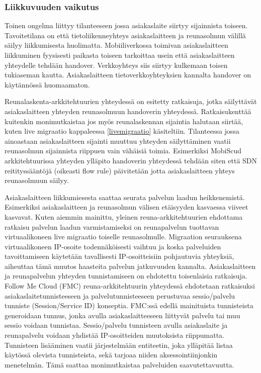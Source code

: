 \subsubsection*{Liikkuvuuden vaikutus}

Toinen ongelma liittyy tilanteeseen jossa asiakaslaite siirtyy sijainnista toiseen. Tavoitetilana on että tietoliikenneyhteys asiakaslaitteen ja reunasolmun välillä säilyy liikkumisesta huolimatta.  
Mobiiliverkossa toimivan asiakaslaitteen liikkuminen fyysisesti paikasta toiseen tarkoittaa usein että asiakaslaitteen yhteydelle tehdään handover.
Verkkoyhteys siis siirtyy kulkemaan toisen tukiaseman kautta. 
Asiakaslaitteen tietoverkkoyhteyksien kannalta handover on käytännössä huomaamaton.

Reunalaskenta-arkkitehtuurien yhteydessä on esitetty ratkaisuja, jotka säilyttävät asiakaslaitteen yhteyden reunasolmuun handoverin yhteydessä. Ratkaisukenttää kuitenkin monimutkaistaa jos myös reunalaskennan sijaintia halutaan siirtää, kuten live migraatio kappaleessa \ref{livemigraatio} käsiteltiin.
Tilanteessa jossa ainoastaan asiakaslaitteen sijainti muuttuu yhteyden säilyttäminen vaatii reunasolmun sijainnista riippuen vain vähäisiä toimia. Esimerkiksi MobiScud arkkitehtuurissa yhteyden ylläpito handoverin yhteydessä tehdään siten että SDN reitityssääntöjä (oikeasti flow rule) päivitetään jotta asiakaslaitteen yhteys reunasolmuun säilyy. 

Asiakaslaitteen liikkumiesesta saattaa seurata palvelun laadun heikkenemistä. Esimerkiksi asiakaslaitteen ja reunasolmun välisen etäisyyden kasvaessa viiveet kasvavat.
Kuten aiemmin mainittu, yleinen reuna-arkkitehtuurien ehdottama ratkaisu palvelun laadun varmistamiseksi on reunapalvelun tuottavan virtuaalikoneen live migraatio toiselle reunasolmulle.
Migraation seurauksena virtuaalikoneen IP-osoite todennäköisesti vaihtuu ja koska palveluiden tavoittamiseen käytetään tavallisesti IP-osoitteisiin pohjautuvia yhteyksiä, aiheuttaa tämä muutos haasteita palvelun jatkuvuuden kannalta.
Asiakaslaitteen ja reunapalvelun yhteyden tunnistamiseen on ehdotettu toisenlaisia ratkaisuja.
Follow Me Cloud (FMC) \cite{taleb2013follow} reuna-arkkitehtuurin yhteydessä ehdotetaan ratkaisuksi asiakaslaitetunnisteeseen ja palvelutunnisteeseen perustuvaa sessio/palvelu tunniste (Session/Service ID) konseptia.
FMC:ssä edellä mainituista tunnisteista generoidaan tunnus, jonka avulla asiakaslaitteeseen liittyvät palvelu tai muu sessio voidaan tunnistaa.
Sessio/palvelu tunnisteen avulla asiakaslaite ja reunapalvelu voidaan yhdistää IP-osoitteiden muutoksista riippumatta.
Tunnisteen lisääminen vaatii järjestelmään entiteetin, joka ylläpitää listaa käytössä olevista tunnisteista, sekä tarjoaa niiden aksessointiinjonkin menetelmän. Tämä saattaa monimutkaistaa palveluiden saavutettavuutta. 

